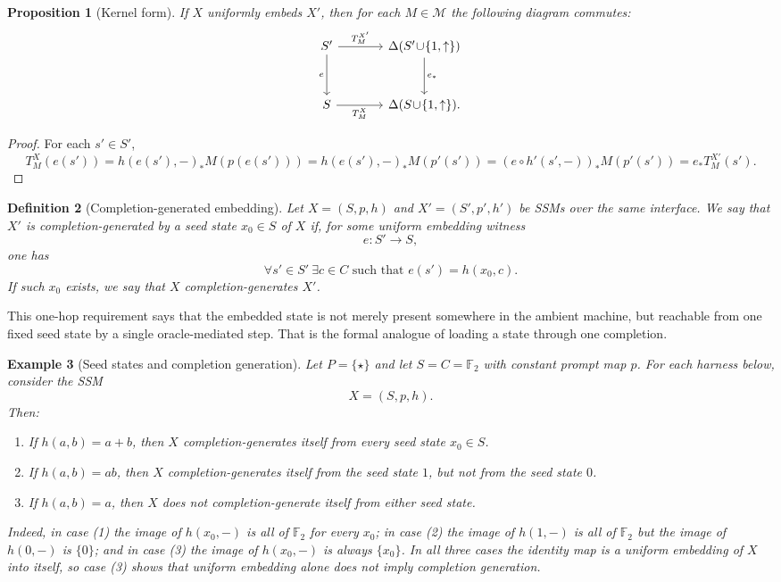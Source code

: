 \documentclass[11pt]{article}
\newtheorem{definition}{Definition}[section]
\newtheorem{proposition}[definition]{Proposition}
\newtheorem{example}[definition]{Example}
\begin{document}
\begin{proposition}[Kernel form]\label{prop:kernel-form}
If $X$ uniformly embeds $X'$, then for each $M\in\mathcal{M}$ the following diagram commutes:
\[
\begin{tikzcd}[column sep=3.6em,row sep=3.0em]
S' \arrow[r,"T_M^{X'}"] \arrow[d,"e"'] & \Delta(S'\!\cup\!\{1,\uparrow\}) \arrow[d,"e_*"] \\
S \arrow[r,"T_M^{X}"'] & \Delta(S\!\cup\!\{1,\uparrow\}).
\end{tikzcd}
\]
\end{proposition}

\begin{proof}
For each $s'\in S'$,
\[
T_M^X(e(s'))=h(e(s'),-)_{*}M(p(e(s')))=h(e(s'),-)_{*}M(p'(s'))=(e\circ h'(s',-))_*M(p'(s'))=e_*T_M^{X'}(s').
\]
\end{proof}

\begin{definition}[Completion-generated embedding]
Let $X=(S,p,h)$ and $X'=(S',p',h')$ be SSMs over the same interface. We say that $X'$ is \emph{completion-generated by a seed state $x_0\in S$ of $X$} if, for some uniform embedding witness
\[
e:S'\to S,
\]
one has
\[
\forall s'\in S'\ \exists c\in C\text{ such that } e(s')=h(x_0,c).
\]
If such $x_0$ exists, we say that $X$ \emph{completion-generates} $X'$.
\end{definition}

This one-hop requirement says that the embedded state is not merely present somewhere in the ambient machine, but reachable from one fixed seed state by a single oracle-mediated step. That is the formal analogue of loading a state through one completion.

\begin{example}[Seed states and completion generation]\label{ex:seeds}
Let $P=\{\star\}$ and let $S=C=\mathbb{F}_2$ with constant prompt map $p$. For each harness below, consider the SSM
\[
X=(S,p,h).
\]
Then:
\begin{enumerate}[label=(\arabic*)]
    \item If $h(a,b)=a+b$, then $X$ completion-generates itself from every seed state $x_0\in S$.
    \item If $h(a,b)=ab$, then $X$ completion-generates itself from the seed state $1$, but not from the seed state $0$.
    \item If $h(a,b)=a$, then $X$ does not completion-generate itself from either seed state.
\end{enumerate}
Indeed, in case (1) the image of $h(x_0,-)$ is all of $\mathbb{F}_2$ for every $x_0$; in case (2) the image of $h(1,-)$ is all of $\mathbb{F}_2$ but the image of $h(0,-)$ is $\{0\}$; and in case (3) the image of $h(x_0,-)$ is always $\{x_0\}$. In all three cases the identity map is a uniform embedding of $X$ into itself, so case (3) shows that uniform embedding alone does not imply completion generation.
\end{example}
\end{document}
